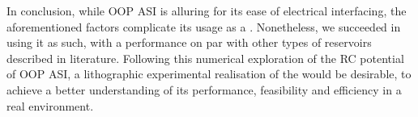 In conclusion, while OOP ASI is alluring for its ease of electrical interfacing, the aforementioned factors complicate its usage as a .
Nonetheless, we succeeded in using it as such, with a performance on par with other types of reservoirs described in literature.
Following this numerical exploration of the RC potential of OOP ASI, a lithographic experimental realisation of the  would be desirable, to achieve a better understanding of its performance, feasibility and efficiency in a real environment.



